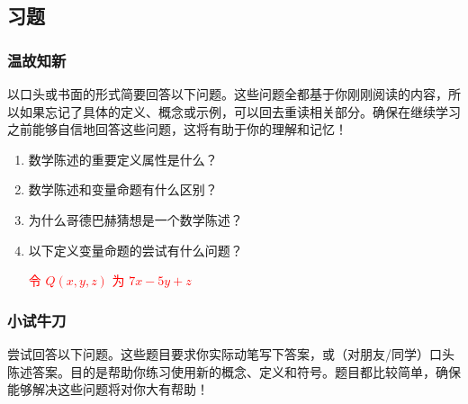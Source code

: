 \subsection{习题}

\subsubsection*{温故知新}

以口头或书面的形式简要回答以下问题。这些问题全都基于你刚刚阅读的内容，所以如果忘记了具体的定义、概念或示例，可以回去重读相关部分。确保在继续学习之前能够自信地回答这些问题，这将有助于你的理解和记忆！

\begin{enumerate}[label=(\arabic*)]
    \item 数学陈述的重要定义属性是什么？
    \item 数学陈述和变量命题有什么区别？
    \item 为什么哥德巴赫猜想是一个数学陈述？
    \item 以下定义变量命题的尝试有什么问题？
        \begin{center}
            \textcolor{red}{令 $Q(x, y, z)$ 为 $7x - 5y + z$}
        \end{center}
\end{enumerate}

\subsubsection*{小试牛刀}

尝试回答以下问题。这些题目要求你实际动笔写下答案，或（对朋友/同学）口头陈述答案。目的是帮助你练习使用新的概念、定义和符号。题目都比较简单，确保能够解决这些问题将对你大有帮助！


